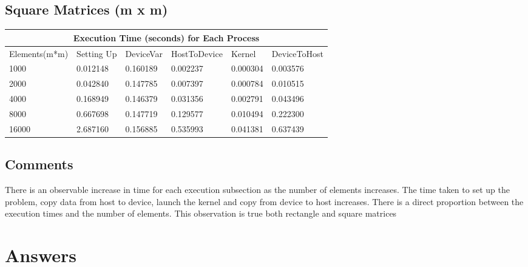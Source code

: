 \documentclass{article}
\begin{document}
 \subsection{Square Matrices (m x m)}
 \begin{tabular}{ |p{2.5cm}||p{2cm}|p{2cm}|p{2cm}|p{2cm}|p{2cm}|  }
 \hline
 \multicolumn{6}{|c|}{Execution Time (seconds) for Each Process }\\
 \hline
Elements(m*m) & Setting Up & DeviceVar & HostToDevice & Kernel & DeviceToHost\\
 \hline
 1000 & 0.012148 & 0.160189 & 0.002237 & 0.000304 & 0.003576\\
 \hline
 2000 & 0.042840 & 0.147785 & 0.007397 & 0.000784 & 0.010515\\
 \hline
 4000 & 0.168949 & 0.146379 & 0.031356 & 0.002791 & 0.043496\\
 \hline
 8000 & 0.667698  & 0.147719 & 0.129577 & 0.010494 & 0.222300\\
 \hline
 16000 & 2.687160 & 0.156885 & 0.535993 & 0.041381 & 0.637439\\
 \hline 
  \end{tabular}
  
\subsection{Comments}
There is an observable increase in time for each execution subsection as the number of elements increases. The time taken to set up the problem, copy data from host to device, launch the kernel and copy from device to host increases. There is a direct proportion between the execution times and the number of elements. This observation is true both rectangle and square matrices

\section{Answers}
\end{document}
